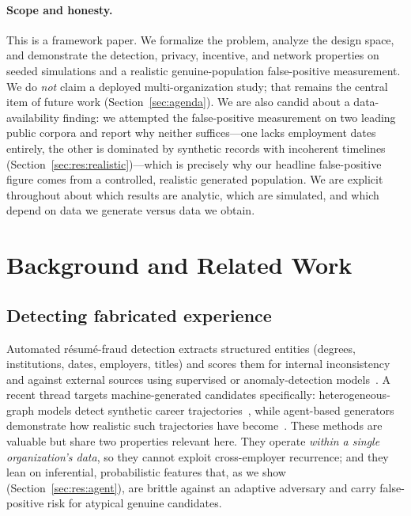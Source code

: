\documentclass[11pt]{article}
\begin{document}
\paragraph{Scope and honesty.} This is a framework paper. We formalize the
problem, analyze the design space, and demonstrate the detection, privacy,
incentive, and network properties on seeded simulations and a realistic
genuine-population false-positive measurement. We do \emph{not} claim a deployed
multi-organization study; that remains the central item of future work
(Section~\ref{sec:agenda}). We are also candid about a data-availability finding:
we attempted the false-positive measurement on two leading public corpora and
report why neither suffices---one lacks employment dates entirely, the other is
dominated by synthetic records with incoherent timelines
(Section~\ref{sec:res:realistic})---which is precisely why our headline
false-positive figure comes from a controlled, realistic generated population. We
are explicit throughout about which results are analytic, which are simulated, and
which depend on data we generate versus data we obtain.

\section{Background and Related Work}\label{sec:related}

\subsection{Detecting fabricated experience}
Automated r\'esum\'e-fraud detection extracts structured entities (degrees,
institutions, dates, employers, titles) and scores them for internal
inconsistency and against external sources using supervised or anomaly-detection
models~\cite{resumefraud2025,resumeml}. A recent thread targets machine-generated
candidates specifically: heterogeneous-graph models detect synthetic career
trajectories~\cite{fakecareers2025}, while agent-based generators demonstrate how
realistic such trajectories have become~\cite{agentgen2025}. These methods are
valuable but share two properties relevant here. They operate \emph{within a
single organization's data}, so they cannot exploit cross-employer recurrence;
and they lean on inferential, probabilistic features that, as we show
(Section~\ref{sec:res:agent}), are brittle against an adaptive adversary and
carry false-positive risk for atypical genuine candidates.
\end{document}
